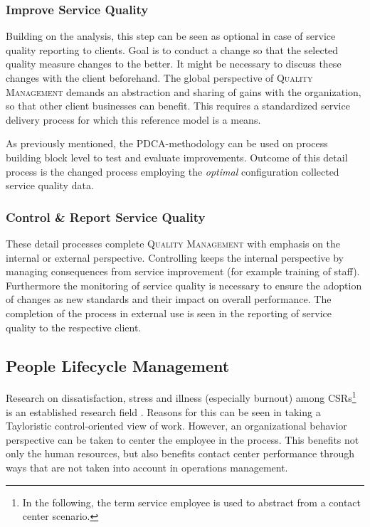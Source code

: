 	\subsubsection{Improve Service Quality}
	Building on the analysis, this step can be seen as optional in case of service quality reporting to clients. Goal is to conduct a change so that the selected quality measure changes to the better. It might be necessary to discuss these changes with the client beforehand. The global perspective of \textsc{Quality Management} demands an abstraction and sharing of gains with the organization, so that other client businesses can benefit. This requires a standardized service delivery process for which this reference model is a means. 
	
	As previously mentioned, the \acrshort{PDCA}-methodology can be used on process building block level to test and evaluate improvements. Outcome of this detail process is the changed process employing the \textit{optimal} configuration \wrt collected service quality data.  
	
	\subsubsection{Control \& Report Service Quality}
	These detail processes complete \textsc{Quality Management} with emphasis on the internal or external perspective. 
	Controlling keeps the internal perspective by managing consequences from service improvement (for example training of staff). Furthermore the monitoring of service quality is necessary to ensure the adoption of changes as new standards and their impact on overall performance.  
	The completion of the process in external use is seen in the reporting of service quality to the respective client. 
	
	\subsection{People Lifecycle Management}
	\label{sec:plmang}
	Research on dissatisfaction, stress and illness (especially burnout) among \acrshort{CSR}s\footnote{In the following, the term service employee is used to abstract from a contact center scenario.} is an established research field \citep[]{Aksin_2009}. Reasons for this can be seen in taking a Tayloristic control-oriented view of work. However, an organizational behavior perspective can be taken to center the employee in the process. This benefits not only the human resources, but also benefits contact center performance through ways that are not taken into account in operations management. 
	

